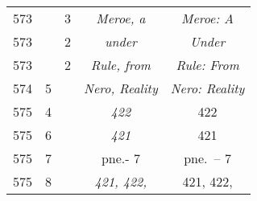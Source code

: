 \documentclass[a4paper,11pt]{article}
\begin{document}
\begin{center}
\begin{tabular}{|c|c|c|c|c|}
    573 & & \hphantom{0}3 & \textit{Meroe, a} & \textit{Meroe: A} \\
    573 & & \hphantom{0}2 & \textit{under} & \textit{Under} \\
    573 & & \hphantom{0}2 & \textit{Rule, from} & \textit{Rule: From} \\
    574 & \hphantom{0}5 & & \textit{Nero, Reality}
    & \textit{Nero: Reality} \\
    575 & \hphantom{0}4 & & \textit{422} & 422 \\
    575 & \hphantom{0}6 & & \textit{421} & 421 \\
    575 & \hphantom{0}7 & & pne.- 7 & pne.~-- 7 \\
    575 & \hphantom{0}8 & & \textit{421, 422,} & 421, 422, \\
    \hline
  \end{tabular}





  \newpage


\end{center}
\end{document}
